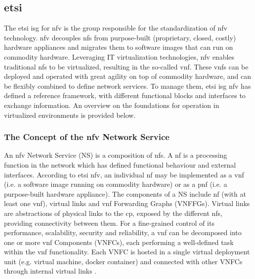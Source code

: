     \subsection{\acrlong{etsi}}
    The \acrfull{etsi} \acrfull{isg} for \acrfull{nfv} is the group responsible for the standardization of \acrshort{nfv} technology. \acrshort{nfv} decouples \acrfull{nf}s from purpose-built (proprietary, closed, costly) hardware appliances and migrates them to software images that can run on commodity hardware. Leveraging IT virtualization technologies, \acrshort{nfv} enables traditional \acrshort{nf}s to be virtualized, resulting in the so-called \acrfull{vnf}. These \acrshort{vnf}s can be deployed and operated with great agility on top of commodity hardware, and can be flexibly combined to define network services. To manage them, \acrshort{etsi} \acrshort{isg} \acrshort{nfv} has defined a reference framework, with different functional blocks and interfaces to exchange information. An overview on the foundations for operation in virtualized environments is provided below. 

        \subsubsection{The Concept of the \acrshort{nfv} Network Service}
        
        An \acrshort{nfv} Network Service (NS) is a composition of \acrshort{nf}s. A \acrshort{nf} is a processing function in the network which has defined functional behaviour and external interfaces. According to \acrshort{etsi} \acrshort{nfv}, an individual \acrshort{nf} may be implemented as a \acrshort{vnf} (i.e. a software image running on commodity hardware) or as a \acrfull{pnf} (i.e. a purpose-built hardware appliance).
        The components of a NS include \acrshort{nf} (with at least one \acrshort{vnf}), virtual links and \acrshort{vnf} Forwarding Graphs (VNFFGs). Virtual links are abstractions of physical links to the \acrfull{cp}, exposed by the different \acrshort{nf}s, providing connectivity between them.
        For a fine-grained control of its performance, scalability, security and reliability, a \acrshort{vnf} can be decomposed into one or more \acrshort{vnf} Components (VNFCs), each performing a well-defined task within the \acrshort{vnf} functionality. Each VNFC is hosted in a single virtual deployment unit (e.g. virtual machine, docker container) and connected with other VNFCs through internal virtual links \cite{8419198}.
        
